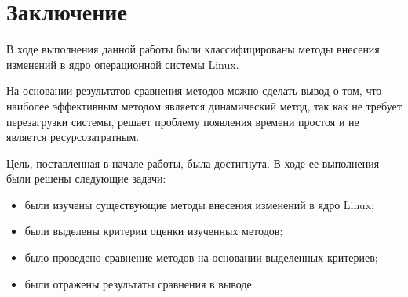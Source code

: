 \chapter*{Заключение}

В ходе выполнения данной работы были классифицированы методы внесения изменений в ядро операционной системы Linux. 

На основании результатов сравнения методов можно сделать вывод о том, что наиболее эффективным методом является динамический метод, так как не требует перезагрузки системы, решает проблему появления времени простоя и не является ресурсозатратным.

Цель, поставленная в начале работы, была достигнута. В ходе ее выполнения были решены следующие задачи:

\begin{itemize}
	\item были изучены существующие методы внесения изменений в ядро Linux;
	\item были выделены критерии оценки изученных методов;
	\item было проведено сравнение методов на основании выделенных критериев;
	\item были отражены результаты сравнения в выводе.
\end{itemize}